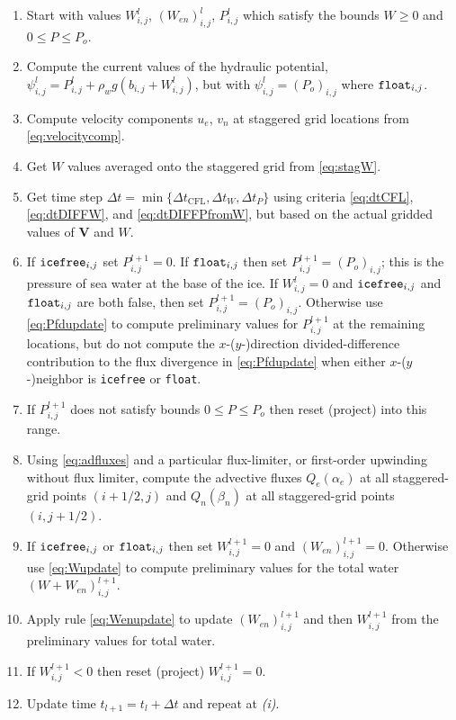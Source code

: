 \documentclass[11pt,final]{amsart}
\newcommand\bV{\mathbf{V}}
\newcommand{\Wlij}{W^l_{i,j}}
\newcommand{\Plij}{P^l_{i,j}}
\begin{document}
\bigskip\medskip
\renewcommand{\labelenumi}{\emph{(\roman{enumi})}}
\begin{enumerate}
\item Start with values $\Wlij$, $(W_{en})_{i,j}^l$, $\Plij$ which satisfy the bounds $W\ge 0$ and $0 \le P \le P_o$.
\item Compute the current values of the hydraulic potential, $\psi_{i,j}^l = \Plij + \rho_w g(b_{i,j} + \Wlij)$, but with $\psi_{i,j}^l=(P_o)_{i,j}$ where $\text{\texttt{float}}_{i,j}$.
\item Compute velocity components $u_e$, $v_n$ at staggered grid locations from \eqref{eq:velocitycomp}.
\item Get $W$ values averaged onto the staggered grid from \eqref{eq:stagW}.
\item Get time step $\Delta t = \min\{\Delta t_{\text{CFL}}, \Delta t_W, \Delta t_P\}$ using criteria \eqref{eq:dtCFL}, \eqref{eq:dtDIFFW}, and \eqref{eq:dtDIFFPfromW}, but based on the actual gridded values of $\bV$ and $W$.
\item If $\text{\texttt{icefree}}_{i,j}$ set $P_{i,j}^{l+1}=0$.  If $\text{\texttt{float}}_{i,j}$ then set $P_{i,j}^{l+1} = (P_o)_{i,j}$; this is the pressure of sea water at the base of the ice.  If $\Wlij=0$ and $\text{\texttt{icefree}}_{i,j}$ and $\text{\texttt{float}}_{i,j}$ are both false, then set $P_{i,j}^{l+1} = (P_o)_{i,j}$.  Otherwise use \eqref{eq:Pfdupdate} to compute preliminary values for $P_{i,j}^{l+1}$ at the remaining locations, but do not compute the $x$-($y$-)direction divided-difference contribution to the flux divergence in \eqref{eq:Pfdupdate} when either $x$-($y$-)neighbor is \texttt{icefree} or \texttt{float}.
\item If $P_{i,j}^{l+1}$ does not satisfy bounds $0 \le P \le P_o$ then reset (project) into this range.
\item Using \eqref{eq:adfluxes} and a particular flux-limiter, or first-order upwinding without flux limiter, compute the advective fluxes $Q_e(\alpha_e)$ at all staggered-grid points $(i+1/2,j)$ and $Q_n(\beta_n)$ at all staggered-grid points $(i,j+1/2)$.  
\item If $\text{\texttt{icefree}}_{i,j}$ or $\text{\texttt{float}}_{i,j}$ then set $W_{i,j}^{l+1}=0$ and $(W_{en})_{i,j}^{l+1}=0$.  Otherwise use \eqref{eq:Wupdate} to compute preliminary values for the total water $(W+W_{en})_{i,j}^{l+1}$.
\item Apply rule \eqref{eq:Wenupdate} to update $(W_{en})_{i,j}^{l+1}$ and then $W_{i,j}^{l+1}$ from the preliminary values for total water.
\item If $W_{i,j}^{l+1}<0$ then reset (project) $W_{i,j}^{l+1}=0$.
\item Update time $t_{l+1}=t_l+\Delta t$ and repeat at \emph{(i)}.
\end{enumerate}
\end{document}

